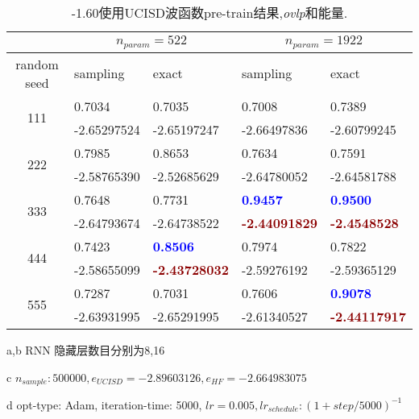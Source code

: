 \begin{table}[htp]
\centering
\captionsetup{labelfont=bf,skip=0pt,font=small,labelsep=space}  
\caption{-1.60使用UCISD波函数pre-train结果,\textit{ovlp}和{能量}.}
\begin{threeparttable}
\begin{tabular}{c|*{4}{p{6em}|}} 
\toprule
&\multicolumn{2}{c|}{$n_{param}=522$\tnote{a}} & \multicolumn{2}{c|}{$n_{param}=1922${\tnote{b}}}\\
\hline
random seed & sampling\tnote{c} & exact& sampling & exact\\
\hline 
\multirow{2}{*}{111} & 0.7034 & 0.7035 & 0.7008 & 0.7389  \\
& -2.65297524 & -2.65197247& -2.66497836 & -2.60799245\\
\hline
\multirow{2}{*}{222} & 0.7985 & 0.8653 & 0.7634 & 0.7591 \\
 & -2.58765390 & -2.52685629 & -2.64780052 & -2.64581788 \\
\hline
\multirow{2}{*}{333} & 0.7648 & 0.7731 & \textcolor{blue}{\textbf{0.9457}} & \textcolor{blue}{\textbf{0.9500}} \\
 & -2.64793674 & -2.64738522 & \textcolor{darkred}{\textbf{-2.44091829}} & \textcolor{darkred}{\textbf{-2.4548528}}\\
\hline
\multirow{2}{*}{444} & 0.7423 & \textcolor{blue}{\textbf{0.8506}}   & 0.7974 & 0.7822 \\
& -2.58655099 & \textcolor{darkred}{\textbf{-2.43728032}} & -2.59276192 & -2.59365129\\
\hline
\multirow{2}{*}{555} & 0.7287 & 0.7031 & 0.7606 & \textcolor{blue}{\textbf{0.9078}} \\
& -2.63931995 & -2.65291995 & -2.61340527 & \textcolor{darkred}{\textbf{-2.44117917}} \\
\bottomrule
\end{tabular}
\begin{tablenotes}
\item[a,b] {RNN 隐藏层数目分别为8,16\\}
\item[c] {$n_{sample}:500000,e_{UCISD}=-2.89603126, e_{HF}=-2.664983075$\\}
\item[d] {opt-type: Adam, iteration-time: 5000, $lr=0.005, lr_{schedule}:(1 + step / 5000)^{-1}$}
\end{tablenotes} 
\end{threeparttable} 
\end{table}

